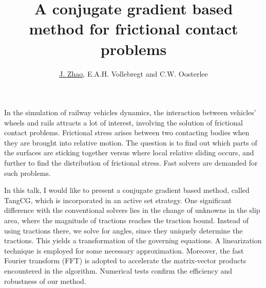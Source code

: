 \documentclass{article}
\title{A conjugate gradient based method for frictional contact problems}
\author{\underline{J. Zhao}, E.A.H. Vollebregt and C.W. Oosterlee}
\affil{Delft Universiry of Technology}
\date{}
\begin{document}
\maketitle

\setcounter{page}{10}
In the simulation of railway vehicles dynamics, the interaction between vehicles' wheels and rails attracts a lot of interest, involving the solution of frictional contact problems. Frictional stress arises between two contacting bodies when they are brought into relative motion. The question is to find out which parts of the surfaces are sticking together versus where local relative sliding occurs, and further to find the distribution of frictional stress. Fast solvers are demanded for such problems.


In this talk, I would like to present a conjugate gradient based method, called TangCG, which is incorporated in an active set strategy. One significant difference with the conventional solvers lies in the change of unknowns in the slip area, where the magnitude of tractions reaches the traction bound. Instead of using tractions there, we solve for angles, since they uniquely determine the tractions. This yields a transformation of the governing equations. A linearization technique is employed for some necessary approximation. Moreover, the fast Fourier transform (FFT) is adopted to accelerate the matrix-vector products encountered in the algorithm. Numerical tests confirm the efficiency and robustness of our method. 
\end{document}
